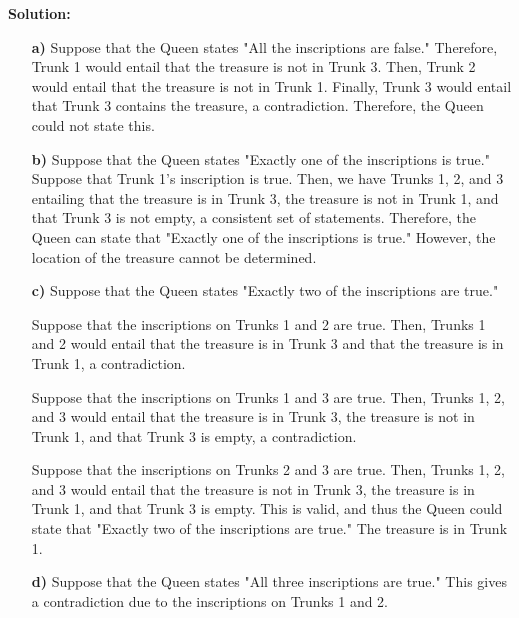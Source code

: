 \documentclass{Axon}
\begin{document}
\noindent
\textbf{Solution:}
\begin{enumerate}
    \item[\textbf{a)}] Suppose that the Queen states "All the inscriptions are false." Therefore, Trunk 1 would entail that the treasure is not in Trunk 3. Then, Trunk 2 would entail that the treasure is not in Trunk 1. Finally, Trunk 3 would entail that Trunk 3 contains the treasure, a contradiction. Therefore, the Queen could not state this.
    
    \item[\textbf{b)}] Suppose that the Queen states "Exactly one of the inscriptions is true." Suppose that Trunk 1's inscription is true. Then, we have Trunks 1, 2, and 3 entailing that the treasure is in Trunk 3, the treasure is not in Trunk 1, and that Trunk 3 is not empty, a consistent set of statements. Therefore, the Queen can state that "Exactly one of the inscriptions is true." However, the location of the treasure cannot be determined.
    
    \item[\textbf{c)}] Suppose that the Queen states "Exactly two of the inscriptions are true."

    Suppose that the inscriptions on Trunks 1 and 2 are true. Then, Trunks 1 and 2 would entail that the treasure is in Trunk 3 and that the treasure is in Trunk 1, a contradiction.

    Suppose that the inscriptions on Trunks 1 and 3 are true. Then, Trunks 1, 2, and 3 would entail that the treasure is in Trunk 3, the treasure is not in Trunk 1, and that Trunk 3 is empty, a contradiction.

    Suppose that the inscriptions on Trunks 2 and 3 are true. Then, Trunks 1, 2, and 3 would entail that the treasure is not in Trunk 3, the treasure is in Trunk 1, and that Trunk 3 is empty. This is valid, and thus the Queen could state that "Exactly two of the inscriptions are true." The treasure is in Trunk 1.
    
    \item[\textbf{d)}] Suppose that the Queen states "All three inscriptions are true." This gives a contradiction due to the inscriptions on Trunks 1 and 2.
\end{enumerate}
\end{document}
